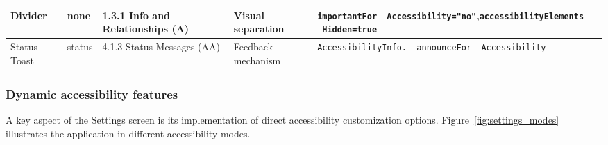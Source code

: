 \begin{longtable}[c]{|C{2.5cm}|C{2cm}|C{2.8cm}|C{2.8cm}|C{4.8cm}|}
\hline
Divider & none & 1.3.1 Info and Relationships (A) & Visual separation & \texttt{importantFor \ Accessibility="no"},\newline \texttt{accessibilityElements \ Hidden=true} \\
\hline
Status Toast & status & 4.1.3 Status Messages (AA) & Feedback mechanism & \texttt{AccessibilityInfo. \ announceFor \ Accessibility} \\
\end{longtable}

\subsubsection{Dynamic accessibility features}

A key aspect of the Settings screen is its implementation of direct accessibility customization options. Figure~\ref{fig:settings_modes} illustrates the application in different accessibility modes.

